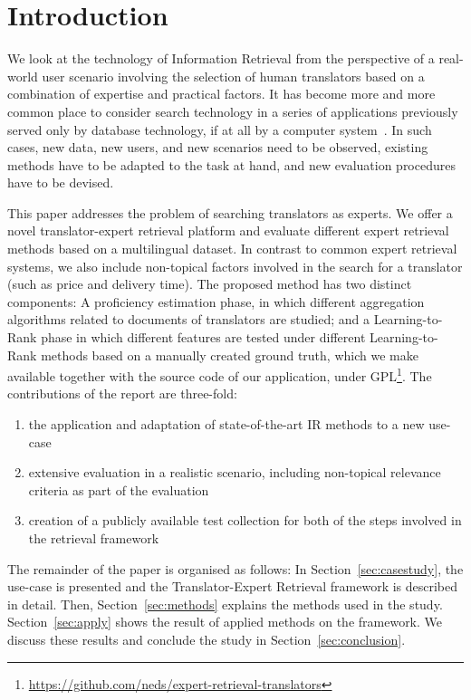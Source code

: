 \section{Introduction}
\label{sec:introduction}
We look at the technology of Information Retrieval from the perspective of a real-world user scenario involving the selection of human translators based on a combination of expertise and practical factors. 
It has become more and more common place to consider search technology in a series of applications previously served only by database technology, if at all by a computer system~\cite{Grefenstette:2011}. In such cases, new data, new users, and new scenarios need to be observed, existing methods have to be adapted to the task at hand, and new evaluation procedures have to be devised. 

This paper addresses the problem of searching translators as experts. We offer a novel translator-expert retrieval platform and evaluate different expert retrieval methods based on a multilingual dataset. In contrast to common expert retrieval systems, we also include non-topical factors involved in the search for a translator (such as price and delivery time).%
 The proposed method has two distinct components: A proficiency estimation phase, in which different aggregation algorithms related to documents of translators are studied; and a Learning-to-Rank phase in which different features are tested under different Learning-to-Rank methods based on a manually created ground truth, which we make available together with the source code of our application, under GPL\footnote{\url{https://github.com/neds/expert-retrieval-translators}}. The contributions of the report are three-fold:
\begin{enumerate}
\vspace{-0.3cm}
\item the application and adaptation of state-of-the-art IR methods to a new use-case
\item extensive evaluation in a realistic scenario, including non-topical relevance criteria as part of the evaluation
\item creation of a publicly available test collection for both of the steps involved in the retrieval framework
\vspace{-0.3cm}
\end{enumerate}

The remainder of the paper is organised as follows: In Section~\ref{sec:casestudy}, the use-case is presented and the Translator-Expert Retrieval framework is described in detail. Then, Section~\ref{sec:methods} explains the methods used in the study. Section~\ref{sec:apply} shows the result of applied methods on the framework. We discuss these results and conclude the study in Section~\ref{sec:conclusion}.
